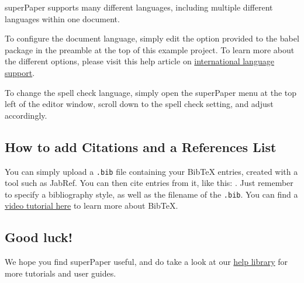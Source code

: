 \documentclass{article}
\begin{document}
superPaper supports many different languages, including multiple different languages within one document.

To configure the document language, simply edit the option provided to the babel package in the preamble at the top of this example project. To learn more about the different options, please visit this help article on \href{https://www.superpaper.com/learn/latex/International_language_support}{international language support}.

To change the spell check language, simply open the superPaper menu at the top left of the editor window, scroll down to the spell check setting, and adjust accordingly.

\subsection{How to add Citations and a References List}

You can simply upload a \verb|.bib| file containing your BibTeX entries, created with a tool such as JabRef. You can then cite entries from it, like this: \cite{greenwade93}. Just remember to specify a bibliography style, as well as the filename of the \verb|.bib|. You can find a \href{https://www.superpaper.com/help/97-how-to-include-a-bibliography-using-bibtex}{video tutorial here} to learn more about BibTeX.

\subsection{Good luck!}

We hope you find superPaper useful, and do take a look at our \href{https://www.superpaper.com/learn}{help library} for more tutorials and user guides.



\end{document}
